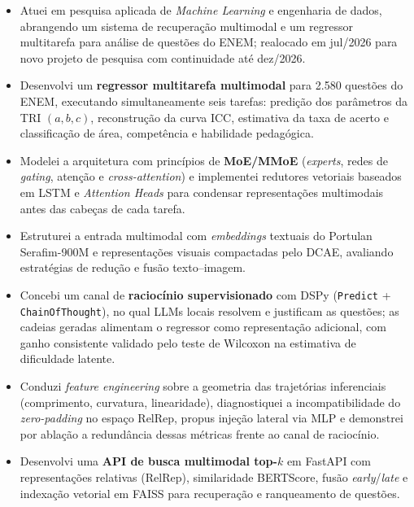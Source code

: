 \documentclass[a4paper,10pt]{article}
\begin{document}
\begin{itemize}

    \item Atuei em pesquisa aplicada de \textit{Machine Learning} e
    engenharia de dados, abrangendo um sistema de recuperação multimodal e
    um regressor multitarefa para análise de questões do ENEM; realocado em
    jul/2026 para novo projeto de pesquisa com continuidade até dez/2026.

    \item Desenvolvi um \textbf{regressor multitarefa multimodal} para
    2.580 questões do ENEM, executando simultaneamente seis tarefas:
    predição dos parâmetros da TRI $(a,b,c)$, reconstrução da curva ICC,
    estimativa da taxa de acerto e classificação de área, competência e
    habilidade pedagógica.

    \item Modelei a arquitetura com princípios de \textbf{MoE/MMoE}
    (\textit{experts}, redes de \textit{gating}, atenção e
    \textit{cross-attention}) e implementei redutores vetoriais baseados em
    LSTM e \textit{Attention Heads} para condensar representações
    multimodais antes das cabeças de cada tarefa.

    \item Estruturei a entrada multimodal com \textit{embeddings} textuais do
    Portulan Serafim-900M e representações visuais compactadas pelo DCAE,
    avaliando estratégias de redução e fusão texto--imagem.

    \item Concebi um canal de \textbf{raciocínio supervisionado} com DSPy
    (\texttt{Predict} + \texttt{ChainOfThought}), no qual LLMs locais
    resolvem e justificam as questões; as cadeias geradas alimentam o
    regressor como representação adicional, com ganho consistente validado
    pelo teste de Wilcoxon na estimativa de dificuldade latente.

    \item Conduzi \textit{feature engineering} sobre a geometria das
    trajetórias inferenciais (comprimento, curvatura, linearidade),
    diagnostiquei a incompatibilidade do \textit{zero-padding} no espaço
    RelRep, propus injeção lateral via MLP e demonstrei por ablação a
    redundância dessas métricas frente ao canal de raciocínio.

    \item Desenvolvi uma \textbf{API de busca multimodal top-$k$} em FastAPI
    com representações relativas (RelRep), similaridade BERTScore, fusão
    \textit{early}/\textit{late} e indexação vetorial em FAISS para
    recuperação e ranqueamento de questões.


\end{itemize}
\end{document}
